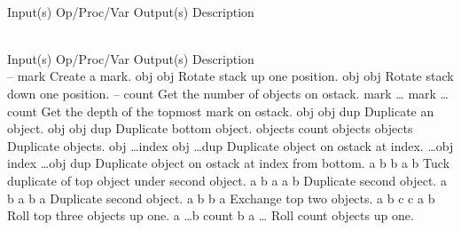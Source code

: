 \begin{longtable}{}
\caption{\label{tab:systemdict}systemdict summary} \\
\hline
\optableent
	{Input(s)}
	{Op/Proc/Var}
	{Output(s)}
	{Description}
\hline \hline
\endfirsthead
\caption[]{\emph{continued}} \\
\hline
\optableent
	{Input(s)}
	{Op/Proc/Var}
	{Output(s)}
	{Description}
\hline \hline \endhead
{} \endfoot
\hline \endlastfoot
 \\
\hline \hline
\optableent
	{--}
	{{\bf {}}}
	{mark}
	{Create a mark.}
\hline
\optableent
	{\commas obj}
	{{\bf {}}}
	{obj \commas}
	{Rotate stack up one position.}
\hline
\optableent
	{obj \commas}
	{{\bf {}}}
	{\commas obj}
	{Rotate stack down one position.}
\hline
\optableent
	{--}
	{{\bf {}}}
	{count}
	{Get the number of objects on ostack.}
\hline
\optableent
	{mark \dots}
	{{\bf {}}}
	{mark \dots count}
	{Get the depth of the topmost mark on ostack.}
\hline
\optableent
	{obj}
	{{\bf {}}}
	{obj dup}
	{Duplicate an object.}
\hline
\optableent
	{obj \commas}
	{{\bf {}}}
	{obj \commas dup}
	{Duplicate bottom object.}
\hline
\optableent
	{objects count}
	{{\bf {}}}
	{objects objects}
	{Duplicate objects.}
\hline
\optableent
	{obj \dots index}
	{{\bf {}}}
	{obj \dots dup}
	{Duplicate object on ostack at index.}
\hline
\optableent
	{\dots obj \commas index}
	{{\bf {}}}
	{\dots obj \commas dup}
	{Duplicate object on ostack at index from bottom.}
\hline
\optableent
	{a b}
	{{\bf {}}}
	{b a b}
	{Tuck duplicate of top object under second object.}
\hline
\optableent
	{a b}
	{{\bf {}}}
	{a a b}
	{Duplicate second object.}
\hline
\optableent
	{a b}
	{{\bf {}}}
	{a b a}
	{Duplicate second object.}
\hline
\optableent
	{a b}
	{{\bf {}}}
	{b a}
	{Exchange top two objects.}
\hline
\optableent
	{a b c}
	{{\bf {}}}
	{c a b}
	{Roll top three objects up one.}
\hline
\optableent
	{a \dots b count}
	{{\bf {}}}
	{b a \dots}
	{Roll count objects up one.}

\end{longtable}
